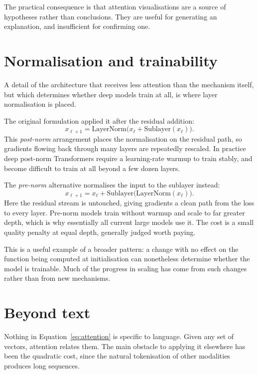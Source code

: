 \documentclass[11pt,a4paper]{article}
\begin{document}
The practical consequence is that attention visualisations are a source of
hypotheses rather than conclusions. They are useful for generating an
explanation, and insufficient for confirming one.

\section{Normalisation and trainability}
\label{sec:norm}

A detail of the architecture that receives less attention than the mechanism
itself, but which determines whether deep models train at all, is where
layer normalisation is placed.

The original formulation applied it after the residual addition:
\begin{equation}
  x_{\ell+1} = \mathrm{LayerNorm}\big(x_\ell + \mathrm{Sublayer}(x_\ell)\big).
  \label{eq:postln}
\end{equation}
This \emph{post-norm} arrangement places the normalisation on the residual
path, so gradients flowing back through many layers are repeatedly rescaled.
In practice deep post-norm Transformers require a learning-rate warmup to
train stably, and become difficult to train at all beyond a few dozen layers.

The \emph{pre-norm} alternative normalises the input to the sublayer instead:
\begin{equation}
  x_{\ell+1} = x_\ell + \mathrm{Sublayer}\big(\mathrm{LayerNorm}(x_\ell)\big).
  \label{eq:preln}
\end{equation}
Here the residual stream is untouched, giving gradients a clean path from the
loss to every layer. Pre-norm models train without warmup and scale to far
greater depth, which is why essentially all current large models use it. The
cost is a small quality penalty at equal depth, generally judged worth paying.

This is a useful example of a broader pattern: a change with no effect on the
function being computed at initialisation can nonetheless determine whether
the model is trainable. Much of the progress in scaling has come from such
changes rather than from new mechanisms.

\section{Beyond text}
\label{sec:vision}

Nothing in Equation~\ref{eq:attention} is specific to language. Given any set
of vectors, attention relates them. The main obstacle to applying it elsewhere
has been the quadratic cost, since the natural tokenisation of other
modalities produces long sequences.
\end{document}
